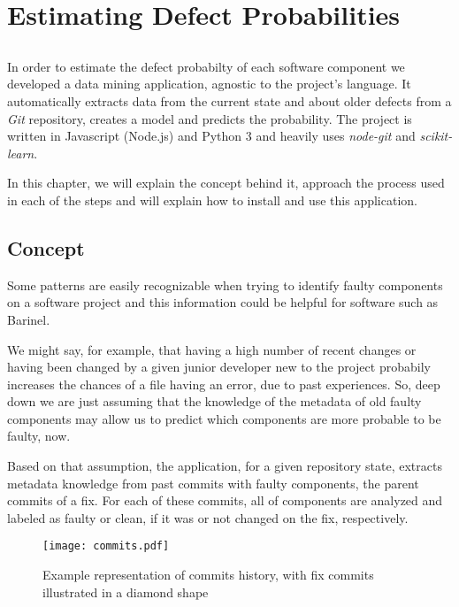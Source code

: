 \chapter{Estimating Defect Probabilities} \label{chap:estimating-dp}

\section*{}

In order to estimate the defect probabilty of each software component we developed a data mining application, agnostic to the project's language. 
It automatically extracts data from the current state and about older defects from a \emph{Git} repository, creates a model and predicts the probability. The project is written in Javascript (Node.js) and Python 3 and heavily uses \emph{node-git}
and \emph{scikit-learn}.

In this chapter, we will explain the concept behind it, approach the process used in each of the steps and will explain how to install and use this application.

\section{Concept}

Some patterns are easily recognizable when trying to identify faulty components on a software project and this information could be helpful for software such as Barinel. 

We might say, for example, that having a high number of recent changes or having been changed by a given junior developer new to the project probabily increases the chances of a file having an error, due to past experiences. So, deep down we are just assuming that the knowledge of the metadata of old faulty components may allow us to predict which components are more probable to be faulty, now.

Based on that assumption, the application, for a given repository state, extracts metadata knowledge from past commits with faulty components, the parent commits of a fix. For each of these commits, all of components are analyzed and labeled as faulty or clean, if it was or not changed on the fix, respectively.
%
\begin{figure}[H]
  \begin{center}
    \leavevmode
    \texttt{[image: commits.pdf]}
    \caption{Example representation of commits history, with fix commits illustrated in a diamond shape}
    \label{fig:commits}
  \end{center}
\end{figure}

